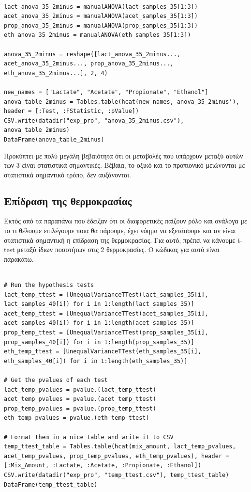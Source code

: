 \documentclass[11pt]{article}
\begin{document}
\begin{verbatim}

lact_anova_35_2minus = manualANOVA(lact_samples_35[1:3])
acet_anova_35_2minus = manualANOVA(acet_samples_35[1:3])
prop_anova_35_2minus = manualANOVA(prop_samples_35[1:3])
eth_anova_35_2minus = manualANOVA(eth_samples_35[1:3])

anova_35_2minus = reshape([lact_anova_35_2minus..., acet_anova_35_2minus..., prop_anova_35_2minus..., eth_anova_35_2minus...], 2, 4)

new_names = ["Lactate", "Acetate", "Propionate", "Ethanol"]
anova_table_2minus = Tables.table(hcat(new_names, anova_35_2minus'), header = [:Test, :FStatistic, :pValue])
CSV.write(datadir("exp_pro", "anova_35_2minus.csv"), anova_table_2minus)
DataFrame(anova_table_2minus)
\end{verbatim}

Προκύπτει με πολύ μεγάλη βεβαιότητα ότι οι μεταβολές που υπάρχουν μεταξύ αυτών των 3 είναι στατιστικά σημαντικές. Βέβαια, το οξικό και το προπιονικό μειώνονται με στατιστικά σημαντικό τρόπο, δεν αυξάνονται.

\subsection{Επίδραση της θερμοκρασίας}
\label{sec:org4735d33}
Εκτός από τα παραπάνω που έδειξαν ότι οι διαφορετικές παίζουν ρόλο και ανάλογα με το τι θέλουμε επιλέγουμε ποια θα πάρουμε, έχει νόημα να εξετάσουμε και αν είναι στατιστικά σημαντική η επίδραση της θερμοκρασίας. Για αυτό, πρέπει να κάνουμε t-test μεταξύ ίδιων ποσοτήτων στις 2 θερμοκρασίες. Ο κώδικας για αυτό είναι παρακάτω.

\begin{verbatim}

# Run the hypothesis tests
lact_temp_ttest = [UnequalVarianceTTest(lact_samples_35[i], lact_samples_40[i]) for i in 1:length(lact_samples_35)]
acet_temp_ttest = [UnequalVarianceTTest(acet_samples_35[i], acet_samples_40[i]) for i in 1:length(acet_samples_35)]
prop_temp_ttest = [UnequalVarianceTTest(prop_samples_35[i], prop_samples_40[i]) for i in 1:length(prop_samples_35)]
eth_temp_ttest = [UnequalVarianceTTest(eth_samples_35[i], eth_samples_40[i]) for i in 1:length(eth_samples_35)]

# Get the pvalues of each test
lact_temp_pvalues = pvalue.(lact_temp_ttest)
acet_temp_pvalues = pvalue.(acet_temp_ttest)
prop_temp_pvalues = pvalue.(prop_temp_ttest)
eth_temp_pvalues = pvalue.(eth_temp_ttest)

# Format them in a nice table and write it to CSV
temp_ttest_table = Tables.table(hcat(mix_amount, lact_temp_pvalues, acet_temp_pvalues, prop_temp_pvalues, eth_temp_pvalues), header = [:Mix_Amount, :Lactate, :Acetate, :Propionate, :Ethanol])
CSV.write(datadir("exp_pro", "temp_ttest.csv"), temp_ttest_table)
DataFrame(temp_ttest_table)
\end{verbatim}
\end{document}
